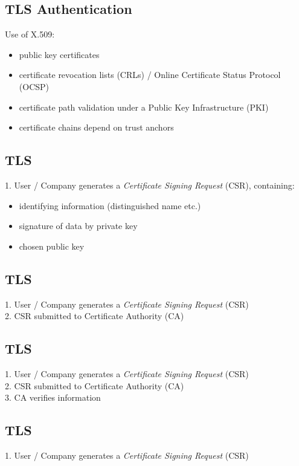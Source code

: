 \documentclass[xga]{xdvislides}
\begin{document}
\subsection{TLS Authentication}
Use of X.509:
\begin{itemize}
	\item public key certificates
	\item certificate revocation lists (CRLs) / Online Certificate Status Protocol (OCSP)
	\item certificate path validation under a Public Key Infrastructure (PKI)
	\item certificate chains depend on trust anchors
\end{itemize}

\subsection{TLS}
1. User / Company generates a {\em Certificate Signing Request} (CSR),
containing:

\begin{itemize}
	\item identifying information (distinguished name etc.)
	\item signature of data by private key
	\item chosen public key
\end{itemize}

\subsection{TLS}
1. User / Company generates a {\em Certificate Signing Request} (CSR) \\

2. CSR submitted to Certificate Authority (CA) \\

\subsection{TLS}
1. User / Company generates a {\em Certificate Signing Request} (CSR) \\

2. CSR submitted to Certificate Authority (CA) \\

3. CA verifies information \\

\subsection{TLS}
1. User / Company generates a {\em Certificate Signing Request} (CSR) \\
\end{document}
